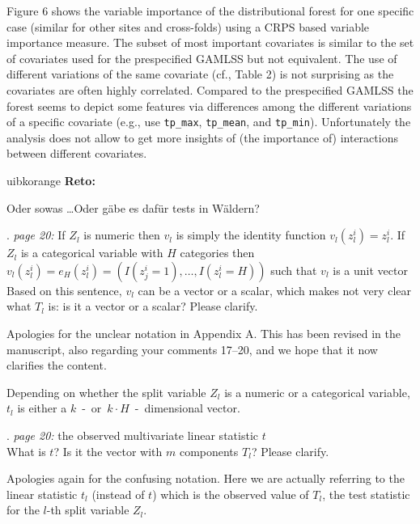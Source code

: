 \documentclass[american,foldmarks=false,noconfig]{uibklttr}
\let\code=\texttt
\newenvironment{review}{\fontshape{\itdefault}\fontseries{\bfdefault} \selectfont \smallskip}{\par}
\newenvironment{reto}{
    \begin{color}{uibkorange}
    \textbf{Reto:~}
        \itshape
}{
    \end{color}
}
\begin{document}
Figure 6 shows the variable importance of the distributional forest
for one specific case (similar for other sites and cross-folds) 
using a CRPS based variable importance measure. The subset of 
most important covariates is similar to the set of covariates 
used for the prespecified GAMLSS but not equivalent.
The use of different variations of the same covariate (cf., Table 2)
is not surprising as the covariates are often highly correlated.
Compared to the prespecified GAMLSS the forest seems to depict some
features via differences among the different variations of a specific
covariate (e.g., use \code{tp\_max}, \code{tp\_mean}, and \code{tp\_min}).
Unfortunately the analysis does not allow to get more insights
of (the importance of) interactions between different covariates.

\begin{reto}
Oder sowas \dots Oder g\"abe es daf\"ur tests in W\"aldern?
\end{reto}


\begin{review}
16. {\color{quotecolor}\textit{page 20:} If $Z_l$ is numeric 
then $v_l$ is simply the identity function $v_l(z_l^i) = z_l^i$. 
If $Z_l$ is a categorical variable with $H$ categories then 
$v_l(z_l^i) = e_H(z_l^i) = (I(z_j^i = 1), \dots , I(z_l^i = H))$ 
such that $v_l$ is a unit vector}\\
Based on this sentence, $v_l$ can be a vector or a scalar, 
which makes not very clear what $T_l$ is: is it a vector 
or a scalar? Please clarify.
\end{review}

Apologies for the unclear notation in Appendix A. This has been 
revised in the manuscript, also regarding your comments 17--20,
and we hope that it now clarifies the content.

Depending on whether the split variable $Z_l$ is a numeric 
or a categorical variable, $t_l$ is either a
$k$~-~or~$k \cdot H$~-~dimensional vector.

\begin{review}
17. {\color{quotecolor}\textit{page 20:} the observed 
multivariate linear statistic $t$}\\
What is $t$? Is it the vector with $m$ components $T_l$? 
Please clarify.
\end{review}

Apologies again for the confusing notation. Here we are 
actually referring to the linear statistic $t_l$ (instead of $t$) 
which is the observed value of $T_l$, the test statistic for 
the $l$-th split variable $Z_l$.
\end{document}
